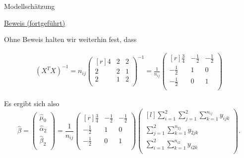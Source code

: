 \documentclass[
  8pt,
  ignorenonframetext,
]{beamer}
\begin{document}
\begin{frame}{Modellschätzung}
\protect\hypertarget{modellschuxe4tzung-3}{}
\footnotesize
\vspace{1mm}

\underline{Beweis (fortgeführt)}

Ohne Beweis halten wir weiterhin fest, dass

\begin{align}
(X^T X)^{-1}
=
n_{ij}
\begin{pmatrix*}[r]
4 & 2 & 2 \\
2 & 2 & 1 \\
2 & 1 & 2\\
\end{pmatrix*}^{-1}
=
\frac{1}{n_{ij}}
\begin{pmatrix*}[r]
 \frac{3}{4} & -\frac{1}{2} & -\frac{1}{2} \\
-\frac{1}{2} & 1            & 0            \\
-\frac{1}{2} & 0            & 1            \\
\end{pmatrix*}
\end{align}

Es ergibt sich also \begin{equation}
\hat{\beta}
=
\begin{pmatrix}
\hat{\mu}_0      \\
\hat{\alpha}_2   \\
\hat{\beta}_2    \\
\end{pmatrix}
=
\frac{1}{n_{ij}}
\begin{pmatrix*}[r]
 \frac{3}{4} & -\frac{1}{2} & -\frac{1}{2} \\
-\frac{1}{2} & 1            & 0            \\
-\frac{1}{2} & 0            & 1            \\
\end{pmatrix*}
\begin{pmatrix*}[l]
\sum_{i=1}^2 \sum_{j=1}^2 \sum_{k = 1}^{n_{ij}} y_{ijk}     \\
\sum_{j=1}^2 \sum_{k = 1}^{n_{2j}} y_{2jk}                  \\
\sum_{i=1}^2 \sum_{k = 1}^{n_{i2}} y_{i2k}                  \\
\end{pmatrix*}.
\end{equation}
\end{frame}
\end{document}

